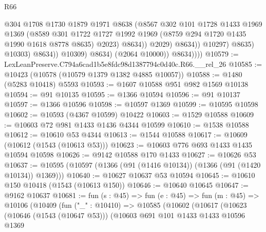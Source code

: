 \begin{lexlean}{R66}
\begin{coremodule}
                                    @304
                                    @1708
                                    @1730
                                    @1879
                                    @1971
                                    @8638
                                    (@8567
                                      @302
                                      @101
                                      @1728
                                      @1433
                                      @1969
                                      @1369
                                      (@8589
                                        @301
                                        @1722
                                        @1727
                                        @1992
                                        @1969
                                        (@8759 @294 @1720 @1435 @1990 @1618 @8778 @8635)
                                        @2023)
                                      @8634))
                                  @2029)
                                @8634))
                            @10297)
                          @8635)
                        @10303)
                      @8634))
                  @10309)
                @8634)
              (@2064 @10000))
            @8634))))
@10579 := LexLeanPreserve.C794a6cad1b5e8fdc98d1387794c0d40c.R66.__rel_26
@10585 := @10423 (@10578 (@10579 @1379 @1382 @4885 @10057))
@10588 := @1480 (@5283 @10418) @5593
@10593 := @1607 @10588 @951 @982 @1569 @10138
@10594 := @91 @10135
@10595 := @1366 @10594
@10596 := @91 @10137
@10597 := @1366 @10596
@10598 := @10597 @1369
@10599 := @10595 @10598
@10602 := @10593 (@4367 @10599) @10422
@10603 := @1529 @10588
@10609 := @10603 @72 @981 @1433 @1436 @4344 @10599
@10610 := @1538 @10588
@10612 := @10610 @53 @4344
@10613 := @1544 @10588
@10617 := @10609 (@10612 (@1543 (@10613 @53)))
@10623 := @10603 @776 @693 @1433 @1435 @10594 @10598
@10626 := @9142 @10588 @170 @1433
@10627 := @10626 @53
@10637 := @10595 (@10597 (@1366 (@91 (@1416 @10134)) (@1366 (@91 (@1420 @10134)) @1369)))
@10640 := @10627 @10637 @53 @10594
@10645 := @10610 @150 @10418 (@1543 (@10613 @150))
@10646 := @10640 @10645
@10647 := @9162 @10637
@10681 := fun (s : @45) =>
  fun (e : @45) =>
  fun (m : @45) =>
  @10106
    (@10409
      (fun ("_" : @10410) =>
      @10585
        (@10602
          (@10617
            (@10623
              (@10646 (@1543 (@10647 @53)))
              (@10603
                @691
                @101
                @1433
                @1433
                @10596
                @1369

\end{coremodule}
\end{lexlean}
